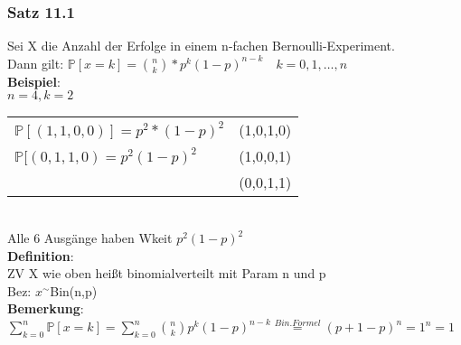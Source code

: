 \subsubsection{Satz 11.1}
Sei X die Anzahl der Erfolge in einem n-fachen Bernoulli-Experiment.\\
Dann gilt: $\mathds{P}[x=k]= \binom{n}{k}*p^k(1-p)^{n-k} \quad k = 0,1,\dots,n$\medskip\\
\textbf{Beispiel}:\\
$n=4, k=2$\smallskip\\
\begin{tabular}{ll}
$	\mathds{P}[(1,1,0,0)] = p^2*(1-p)^2$ & (1,0,1,0)\\
$\mathds{P}[(0,1,1,0)= p^2(1-p)^2$ & (1,0,0,1)\\
	&(0,0,1,1) 
\end{tabular}\smallskip\\
Alle 6 Ausgänge haben Wkeit $p^2(1-p)^2$\medskip\\
\textbf{Definition}:\\
ZV X wie oben heißt binomialverteilt mit Param n und p\\
Bez: $x^\sim$Bin(n,p)\smallskip\\
\textbf{Bemerkung}: $\sum_{k=0}^n\mathds{P}[x=k]=\sum_{k=0}^n\binom{n}{k}p^k(1-p)^{n-k}\overset{Bin. Formel}{=}(p+1-p)^n = 1^n=1$\medskip\\
